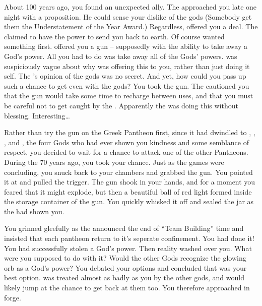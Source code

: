 \documentclass[char]{guardians}
\begin{document}
About 100 years ago, you found an unexpected ally. The \cWarden{} approached you late one night with a proposition. He could sense your dislike of the gods (Somebody get \cWarden{\them} them the Understatement of the Year Award.) Regardless, \cWarden{\They} offered you a deal. The \cWarden{} claimed to have the power to send you back to earth. Of course \cWarden{\they} wanted something first. \cWarden{} offered you a gun -- supposedly with the ability to take away a God's power.  All you had to do was take away all of the Gods' powers. \cWarden{\They} was suspiciously vague about why \cWarden{\they} was offering this to you, rather than just doing it \cWarden{\them}self. The \cWarden{}'s opinion of the gods was no secret. And yet, how could you pass up such a chance to get even with the gods? You took the gun. The \cWarden{} cautioned you that the gun would take some time to recharge between uses, and that you must be careful not to get caught by the \cCaretaker{}. Apparently the \cWarden{} was doing this without \cCaretaker{\them} blessing. Interesting\ldots{}

Rather than try the gun on the Greek Pantheon first, since it had dwindled to \cZeus{}, \cAthena{}, \cHephaestus{}, and \cHera{}, the four Gods who had ever shown you kindness and some semblance of respect, you decided to wait for a chance to attack one of the other Pantheons.  During the \pGames{} 70 years ago, you took your chance. Just as the games were concluding, you snuck back to your chambers and grabbed the gun. You pointed it at \cOsiris{} and pulled the trigger. The gun shook in your hands, and for a moment you feared that it might explode, but then a beautiful ball of red light formed inside the storage container of the gun. You quickly whisked it off and sealed the jar as the \cWarden{} had shown you.

You grinned gleefully as the \cCaretaker{} announced the end of ``Team Building'' time and insisted that each pantheon return to it's seperate confinement. You had done it! You had successfully stolen a God's power. Then reality washed over you. What were you supposed to do with it? Would the other Gods recognize the glowing orb as a God's power? You debated your options and concluded that \cHephaestus{} was your best option. \cHephaestus{\They} was treated almost as badly as you by the other gods, and would likely jump at the chance to get back at them too. You therefore approached \cHephaestus{} in \cHephaestus{\their} forge.
\end{document}
